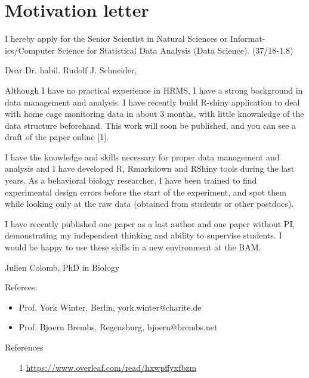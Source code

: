 \section* {Motivation letter}

I hereby apply for the Senior Scientist in Natural Sciences or Informat-ics/Computer Science for Statistical Data Analysis (Data Science). (37/18-1.8)

\vspace {0.5cm} 

Dear Dr. habil. Rudolf J. Schneider,

Although I have no practical experience in HRMS, I have a strong background in data management and analysis. I have recently build R-shiny application to deal with home cage monitoring data in about 3 months, with little knownledge of the data structure beforehand. This work will soon be published, and you can see a draft of the paper online [1].

I have the knowledge and skills necessary for proper data management and analysis and I have developed R, Rmarkdown and RShiny tools during the last years.
As a behavioral biology researcher, I have been trained to find experimental design errors before the start of the experiment, and spot them while looking only at the raw data (obtained from students or other postdocs).

 
I have recently published one paper as a last author and one paper without PI, demonstrating my independent thinking and ability to supervise students. 
I would be happy to use these skills in a new environment at the BAM.


Julien Colomb, PhD in Biology










%
Referees:
\begin{itemize}[noitemsep,topsep=0pt]
\item Prof. York Winter, Berlin, york.winter@charite.de
 
\item Prof. Bjoern Brembs, Regensburg, bjoern@brembs.net
\end{itemize}

References
\begin{itemize}[noitemsep,topsep=0pt]

\item [1] \url{https://www.overleaf.com/read/hxwpffyxfbzm}



\end{itemize}
\newpage 

